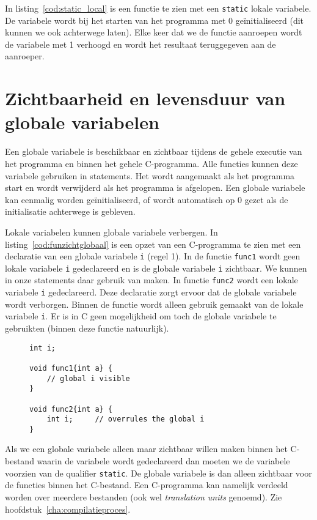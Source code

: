 In listing~\ref{cod:static_local} is een functie te zien met een \texttt{static} lokale variabele. De variabele wordt bij het starten van het programma met 0 geïnitialiseerd (dit kunnen we ook achterwege laten).
Elke keer dat we de functie aanroepen wordt de variabele met 1 verhoogd en wordt het resultaat teruggegeven aan de aanroeper.



\section{Zichtbaarheid en levensduur van globale variabelen}
Een globale variabele is beschikbaar en zichtbaar tijdens de gehele executie van het programma en binnen het gehele C-programma. Alle functies kunnen deze variabele gebruiken in statements. Het wordt aangemaakt als het programma start en wordt verwijderd als het programma is afgelopen. Een globale variabele kan eenmalig worden geïnitialiseerd, of wordt automatisch op 0 gezet als de initialisatie achterwege is gebleven.

Lokale variabelen kunnen globale variabele verbergen. In listing~\ref{cod:funzichtglobaal} is een opzet van een C-programma te zien met een declaratie van een globale variabele \texttt{i} (regel 1). In de functie \texttt{func1} wordt geen lokale variabele \texttt{i} gedeclareerd en is de globale variabele \texttt{i} zichtbaar. We kunnen in onze statements daar gebruik van maken. In functie \texttt{func2} wordt een lokale variabele \texttt{i} gedeclareerd. Deze declaratie zorgt ervoor dat de globale variabele wordt verborgen. Binnen de functie wordt alleen gebruik gemaakt van de lokale variabele \texttt{i}. Er is in C geen mogelijkheid om toch de globale variabele te gebruikten (binnen deze functie natuurlijk).

\begin{figure}[!t]
\begin{lstlisting}[caption=Zichtbaarheid van globale variabelen.,label=cod:funzichtglobaal]
int i;

void func1{int a} {
    // global i visible
}

void func2{int a} {
    int i;     // overrules the global i
}
\end{lstlisting}
\end{figure}

Als we een globale variabele alleen maar zichtbaar willen maken binnen het C-bestand waarin de variabele wordt gedeclareerd dan moeten we de variabele voorzien van de qualifier \texttt{static}.
De globale variabele is dan alleen zichtbaar voor de functies binnen het C-bestand. Een C-programma kan namelijk verdeeld worden over meerdere bestanden (ook wel \textsl{translation units} genoemd). Zie hoofdstuk~\ref{cha:compilatieproces}.


